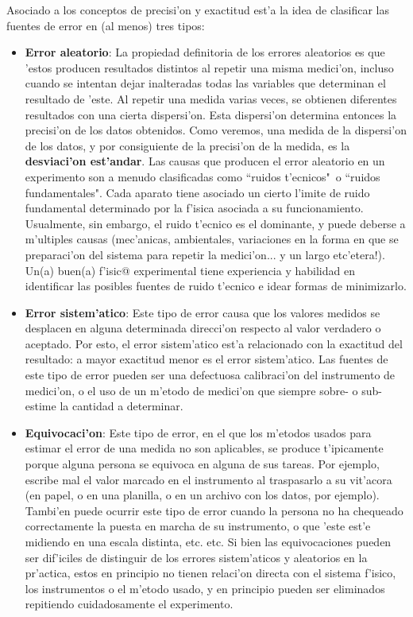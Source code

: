 \documentclass[a4paper]{report}
\begin{document}
Asociado a los conceptos de precisi'on y exactitud est'a la idea de clasificar las fuentes de error en (al menos) tres tipos:
\begin{itemize}
\item \textbf{Error aleatorio}: La propiedad definitoria de los errores aleatorios es que 'estos producen resultados distintos al repetir una misma medici'on, incluso cuando se intentan dejar inalteradas todas las variables que determinan el resultado de 'este. Al repetir una medida varias veces, se obtienen diferentes resultados con una cierta dispersi'on. Esta dispersi'on determina entonces la precisi'on de los datos obtenidos. Como veremos, una medida de la dispersi'on de los datos, y por consiguiente de la precisi'on de la medida, es la \textbf{desviaci'on est'andar}. Las causas que producen el error aleatorio en un experimento son a menudo clasificadas como ``ruidos t'ecnicos"\, o ``ruidos fundamentales". Cada aparato tiene asociado un cierto l'imite de ruido fundamental determinado por la f'isica asociada a su funcionamiento. Usualmente, sin embargo, el ruido t'ecnico es el dominante, y puede deberse a m'ultiples causas (mec'anicas, ambientales, variaciones en la forma en que se preparaci'on del sistema para repetir la medici'on... y un largo etc'etera!). Un(a) buen(a) f'isic@ experimental tiene experiencia y habilidad en identificar las posibles fuentes de ruido t'ecnico e idear formas de minimizarlo.

\item \textbf{Error sistem'atico}: Este tipo de error causa que los valores medidos se desplacen en alguna determinada direcci'on respecto al valor verdadero o aceptado. Por esto,  el error sistem'atico est'a relacionado con la exactitud del resultado: a mayor exactitud menor es el error sistem'atico. Las fuentes de este tipo de error pueden ser una defectuosa calibraci'on del instrumento de medici'on, o el uso de un m'etodo de medici'on que siempre sobre- o sub-estime la cantidad a determinar.

\item \textbf{Equivocaci'on}: Este tipo de error, en el que los m'etodos usados para estimar el error de una medida no son aplicables, se produce t'ipicamente porque alguna persona se equivoca en alguna de sus tareas. Por ejemplo, escribe mal el valor marcado en el instrumento al traspasarlo a su vit'acora (en papel, o en una planilla, o en un archivo con los datos, por ejemplo). Tambi'en puede ocurrir este tipo de error cuando la persona no ha chequeado correctamente la puesta en marcha de su instrumento, o que 'este est'e midiendo en una escala distinta, etc. etc. Si bien las equivocaciones pueden ser dif'iciles de distinguir de los errores sistem'aticos y aleatorios en la pr'actica, estos en principio no tienen relaci'on directa con el sistema f'isico, los instrumentos o el m'etodo usado, y en principio pueden ser eliminados repitiendo cuidadosamente el experimento.
\end{itemize}
\end{document}
